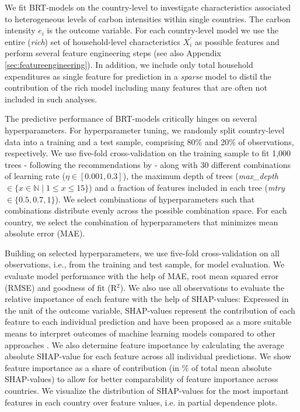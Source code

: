 \documentclass[12pt, a4paper]{article}
\begin{document}
We fit BRT-models on the country-level to investigate characteristics associated to heterogeneous levels of carbon intensities within single countries. The carbon intensity $e_{i}$ is the outcome variable. For each country-level model we use the entire (\textit{rich}) set of household-level characteristics $X_{i}^{'}$ as possible features and perform several feature engineering steps (see also Appendix \ref{sec:featureengineering}). In addition, we include only total household expenditures as single feature for prediction in a \textit{sparse} model to distil the contribution of the rich model including many features that are often not included in such analyses.

The predictive performance of BRT-models critically hinges on several hyperparameters. For hyperparameter tuning, we randomly split country-level data into a training and a test sample, comprising 80\% and 20\% of observations, respectively. We use five-fold cross-validation on the training sample to fit 1,000 trees - following the recommendations by \textcite{Elith.2008} - along with 30 different combinations of learning rate ($\eta \in [0.001,0.3]$), the maximum depth of trees (\textit{max\_depth} $\in \{x \in \mathbb{N} \mid 1  \leq x \leq 15 \}$) and a fraction of features included in each tree (\textit{mtry} $\in \{0.5,0.7,1\}$). We select combinations of hyperparameters such that combinations distribute evenly across the possible combination space. For each country, we select the combination of hyperparameters that minimizes mean absolute error (MAE).

Building on selected hyperparameters, we use five-fold cross-validation on all observations, i.e., from the training and test sample, for model evaluation. We evaluate model performance with the help of MAE, root mean squared error (RMSE) and goodness of fit (R$^{2}$). We also use all observations to evaluate the relative importance of each feature with the help of SHAP-values: Expressed in the unit of the outcome variable, SHAP-values represent the contribution of each feature to each individual prediction and have been proposed as a more suitable means to interpret outcomes of machine learning models compared to other approaches \autocite{Lundberg.2020}. We also determine feature importance by calculating the average absolute SHAP-value for each feature across all individual predictions. We show feature importance as a share of contribution (in \% of total mean absolute SHAP-values) to allow for better comparability of feature importance across countries. We visualize the distribution of SHAP-values for the most important features in each country over feature values, i.e. in partial dependence plots. 
\end{document}
